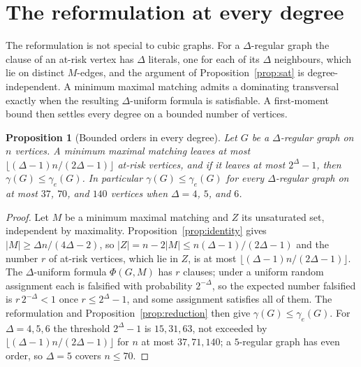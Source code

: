 \documentclass[11pt]{article}
\newtheorem{proposition}{Proposition}
\theoremstyle{definition}
\theoremstyle{remark}
\newcommand{\edom}{\gamma_{e}}
\begin{document}
\section{The reformulation at every degree}\label{sec:degrees}

The reformulation is not special to cubic graphs. For a $\Delta$-regular graph
the clause of an at-risk vertex has $\Delta$ literals, one for each of its
$\Delta$ neighbours, which lie on distinct $M$-edges, and the argument of
Proposition~\ref{prop:sat} is degree-independent. A minimum maximal matching admits a dominating transversal
exactly when the resulting $\Delta$-uniform formula is satisfiable. A first-moment bound then
settles every degree on a bounded number of vertices.

\begin{proposition}[Bounded orders in every degree]\label{prop:bddorder}
Let $G$ be a $\Delta$-regular graph on $n$ vertices. A minimum maximal matching
leaves at most $\lfloor (\Delta-1)n/(2\Delta-1) \rfloor$ at-risk vertices, and if
it leaves at most $2^\Delta - 1$, then $\gamma(G) \le \edom(G)$. In
particular $\gamma(G) \le \edom(G)$ for every $\Delta$-regular graph on at most
$37$, $70$, and $140$ vertices when $\Delta = 4$, $5$, and $6$.
\end{proposition}

\begin{proof}
Let $M$ be a minimum maximal matching and $Z$ its unsaturated set, independent by
maximality. Proposition~\ref{prop:identity} gives $|M| \ge \Delta n/(4\Delta-2)$,
so $|Z| = n - 2|M| \le n(\Delta-1)/(2\Delta-1)$ and the number $r$ of at-risk
vertices, which lie
in $Z$, is at most $\lfloor (\Delta-1)n/(2\Delta-1) \rfloor$. The
$\Delta$-uniform formula $\Phi(G,M)$ has $r$ clauses; under a uniform random
assignment each is falsified with probability $2^{-\Delta}$, so the expected
number falsified is $r\,2^{-\Delta} < 1$ once $r \le 2^\Delta - 1$, and some
assignment satisfies all of them. The reformulation and
Proposition~\ref{prop:reduction} then give $\gamma(G) \le \edom(G)$. For $\Delta = 4, 5, 6$ the threshold $2^\Delta - 1$ is $15, 31, 63$, not exceeded
by $\lfloor (\Delta-1)n/(2\Delta-1) \rfloor$ for $n$ at most $37, 71, 140$; a
$5$-regular graph has even order, so $\Delta = 5$ covers $n \le 70$.
\end{proof}
\end{document}
